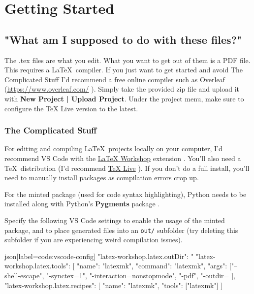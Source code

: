 \section{Getting Started}

\subsection{"What am I supposed to do with these files?"}

The .tex files are what you edit.
What you want to get out of them is a PDF file.
This requires a \LaTeX\ compiler.
If you just want to get started and avoid The Complicated Stuff I'd recommend a free online compiler such as Overleaf (\url{https://www.overleaf.com/} \parencite{overleaf}).
Simply take the provided zip file and upload it with \textbf{New Project | Upload Project}.
Under the project menu, make sure to configure the TeX Live version to the latest.

\subsubsection{The Complicated Stuff}

For editing and compiling \LaTeX\ projects locally on your computer, I'd recommend VS Code with the \href{https://marketplace.visualstudio.com/items?itemName=James-Yu.latex-workshop}{LaTeX Workshop} extension \parencite{workshop}.
You'll also need a \TeX\ distribution (I'd recommend \href{https://www.tug.org/texlive/acquire-netinstall.html}{TeX Live} \parencite{texlive}).
If you don't do a full install, you'll need to manually install packages as compilation errors crop up.

For the minted package (used for code syntax highlighting), Python needs to be installed along with Python's \textbf{Pygments} package \parencite{pygmentize}.

Specify the following VS Code settings to enable the usage of the minted package, and to place generated files into an \texttt{out/} subfolder (try deleting this subfolder if you are experiencing weird compilation issues).
\begin{code}{json}[label=code:vscode-config]
"latex-workshop.latex.outDir": "%
"latex-workshop.latex.tools": [{
    "name": "latexmk",
    "command": "latexmk",
    "args": ["--shell-escape", "-synctex=1", "-interaction=nonstopmode", "-pdf", "-outdir=%
}],
"latex-workshop.latex.recipes": [{
    "name": "latexmk",
    "tools": ["latexmk"]
}]
\end{code}

